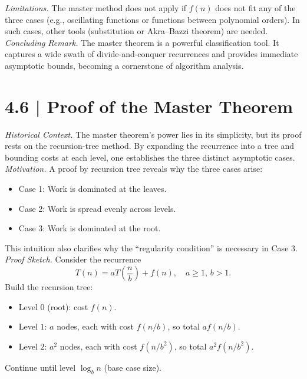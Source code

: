 \documentclass[12pt]{article}
\newcommand{\microhead}[1]{\vspace{0.45em}\noindent\textit{#1}}
\theoremstyle{definition}
\begin{document}
\microhead{Limitations.} The master method does not apply if $f(n)$ does not fit any of the three cases (e.g., oscillating functions or functions between polynomial orders). In such cases, other tools (substitution or Akra–Bazzi theorem) are needed. \\

\microhead{Concluding Remark.} The master theorem is a powerful classification tool. It captures a wide swath of divide-and-conquer recurrences and provides immediate asymptotic bounds, becoming a cornerstone of algorithm analysis. \\

\newpage

\dotfill
\section*{4.6 | Proof of the Master Theorem}
\dotfill

\microhead{Historical Context.} The master theorem’s power lies in its simplicity, but its proof rests on the recursion-tree method. By expanding the recurrence into a tree and bounding costs at each level, one establishes the three distinct asymptotic cases. \\

\microhead{Motivation.} A proof by recursion tree reveals why the three cases arise:
\begin{itemize}
\item Case 1: Work is dominated at the leaves.
\item Case 2: Work is spread evenly across levels.
\item Case 3: Work is dominated at the root.
\end{itemize}
This intuition also clarifies why the “regularity condition” is necessary in Case 3. \\

\microhead{Proof Sketch.}  
Consider the recurrence
\[
T(n) = aT\!\left(\frac{n}{b}\right) + f(n), \quad a \ge 1,\, b > 1.
\]
Build the recursion tree:
\begin{itemize}
\item Level $0$ (root): cost $f(n)$.
\item Level $1$: $a$ nodes, each with cost $f(n/b)$, so total $a f(n/b)$.
\item Level $2$: $a^2$ nodes, each with cost $f(n/b^2)$, so total $a^2 f(n/b^2)$.
\end{itemize}
Continue until level $\log_b n$ (base case size).  
\end{document}
